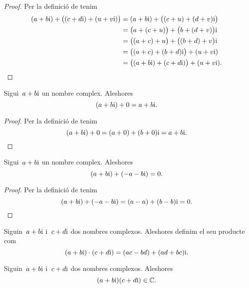 \documentclass[../analisi-complexa.tex]{subfiles}
\begin{document}
    \begin{proof}
        Per la definició de  tenim
        \begin{align*}
            (a+b\mathrm{i})+\big((c+d\mathrm{i})+(u+v\mathrm{i})\big)
                &= (a+b\mathrm{i})+\big((c+u)+(d+v)\mathrm{i}\big) \\
                &= \big(a+(c+u)\big)+\big(b+(d+v)\big)\mathrm{i} \\
                &= \big((a+c)+u\big)+\big((b+d)+v\big)\mathrm{i} \\
                &= \big((a+c)+(b+d)\mathrm{i}\big)+(u+v\mathrm{i}) \\
                &= \big((a+b\mathrm{i})+(c+d\mathrm{i})\big)+(u+v\mathrm{i}).\qedhere
        \end{align*}
    \end{proof}
    \begin{proposition}
        \label{prop:element-neutre-per-la-suma-dels-complexos}
        Sigui~\(a+b\mathrm{i}\) un nombre complex.
        Aleshores
        \[
            (a+b\mathrm{i})+0 = a+b\mathrm{i}.
        \]
    \end{proposition}
    \begin{proof}
        Per la definició de  tenim
        \[
            (a+b\mathrm{i})+0 = (a+0)+(b+0)\mathrm{i} = a+b\mathrm{i}.\qedhere
        \]
    \end{proof}
    \begin{proposition}
        \label{prop:element-invers-per-la-suma-dels-complexos}
        Sigui~\(a+b\mathrm{i}\) un nombre complex.
        Aleshores
        \[
            (a+b\mathrm{i})+(-a-b\mathrm{i}) = 0.
        \]
    \end{proposition}
    \begin{proof}
        Per la definició de  tenim
        \[
            (a+b\mathrm{i})+(-a-b\mathrm{i}) = (a-a)+(b-b)\mathrm{i} = 0.\qedhere
        \]
    \end{proof}
    \begin{definition}
        \label{def:producte-de-nombres-complexos}
        Siguin~\(a+b\mathrm{i}\) i~\(c+d\mathrm{i}\) dos nombres complexos.
        Aleshores definim el seu producte com
        \[
            (a+b\mathrm{i})\cdot(c+d\mathrm{i}) = (ac-bd)+(ad+bc)\mathrm{i}.
        \]
    \end{definition}
    \begin{observation}
        \label{obs:els-nombres-complexos-estan-tancats-pel-producte}
        Siguin~\(a+b\mathrm{i}\) i~\(c+d\mathrm{i}\) dos nombres complexos.
        Aleshores
        \[
            (a+b\mathrm{i})(c+d\mathrm{i})\in\mathbb{C}.
        \]
    \end{observation}
\end{document}
